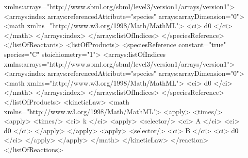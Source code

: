 \begin{example}
                    xmlns:arrays="http://www.sbml.org/sbml/level3/version1/arrays/version1">
                    <arrays:index arrays:referencedAttribute="species" arrays:arrayDimension="0">
                        <math xmlns="http://www.w3.org/1998/Math/MathML">
                            <ci> d0 </ci>
                        </math>
                    </arrays:index>
                </arrays:listOfIndices>
            </speciesReference>
        </listOfReactants>
        <listOfProducts>
            <speciesReference constant="true" species="C" stoichiometry="1">
                <arrays:listOfIndices
                    xmlns:arrays="http://www.sbml.org/sbml/level3/version1/arrays/version1">
                    <arrays:index arrays:referencedAttribute="species" arrays:arrayDimension="0">
                        <math xmlns="http://www.w3.org/1998/Math/MathML">
                            <ci> d0 </ci>
                        </math>
                    </arrays:index>
                </arrays:listOfIndices>
            </speciesReference>
        </listOfProducts>
        <kineticLaw>
            <math xmlns="http://www.w3.org/1998/Math/MathML">
                <apply>
                    <times/>
                    <apply>
                        <times/>
                        <ci> k </ci>
                        <apply>
                            <selector/>
                            <ci> A </ci>
                            <ci> d0 </ci>
                        </apply>
                    </apply>
                    <apply>
                        <selector/>
                        <ci> B </ci>
                        <ci> d0 </ci>
                    </apply>
                </apply>
            </math>
        </kineticLaw>
    </reaction>
</listOfReactions>
\end{example}




